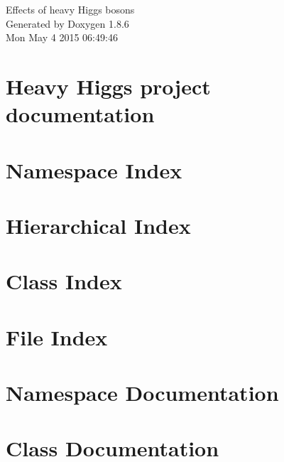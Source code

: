 \documentclass[twoside]{book}
\newcommand{\clearemptydoublepage}{%
  \newpage{\pagestyle{empty}\cleardoublepage}%
}
\begin{document}
\hypersetup{pageanchor=false}
\begin{titlepage}
\vspace*{7cm}
\begin{center}%
{\Large Effects of heavy Higgs bosons }\\
\vspace*{1cm}
{\large Generated by Doxygen 1.8.6}\\
\vspace*{0.5cm}
{\small Mon May 4 2015 06:49:46}\\
\end{center}
\end{titlepage}
\clearemptydoublepage
\tableofcontents
\clearemptydoublepage
{}
\hypersetup{pageanchor=true}

\chapter{Heavy Higgs project documentation}
\label{index}\hypertarget{index}{}
\chapter{Namespace Index}

\chapter{Hierarchical Index}

\chapter{Class Index}

\chapter{File Index}

\chapter{Namespace Documentation}



\chapter{Class Documentation}























\end{document}
